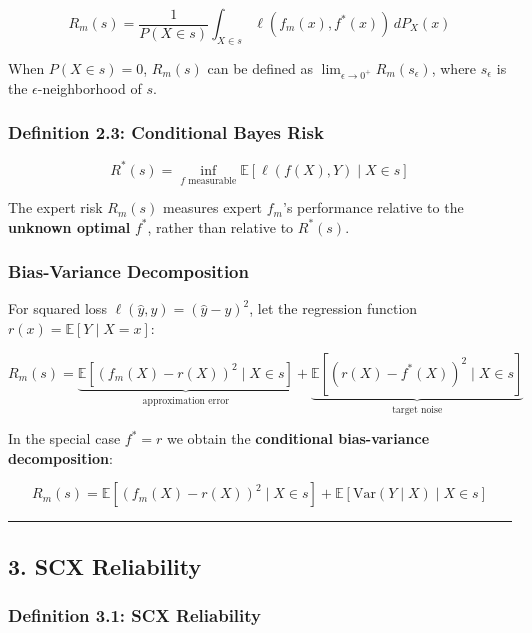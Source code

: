 \documentclass[
  12pt,
]{ctexart}
\begin{document}
\[R_m(s) = \frac{1}{P(X \in s)} \int_{X \in s} \ell(f_m(x), f^*(x)) \, dP_X(x)\]

When \(P(X \in s) = 0\), \(R_m(s)\) can be defined as
\(\lim_{\epsilon \to 0^+} R_m(s_\epsilon)\), where \(s_\epsilon\) is the \(\epsilon\)-neighborhood of \(s\).

\subsubsection{Definition 2.3: Conditional Bayes Risk}\label{definition-2.3-conditional-bayes-risk}

\[R^*(s) = \inf_{f \text{ measurable}} \mathbb{E}[\ell(f(X), Y) \mid X \in s]\]

The expert risk \(R_m(s)\) measures expert \(f_m\)'s performance relative to the \textbf{unknown optimal} \(f^*\), rather than relative to \(R^*(s)\).

\subsubsection{Bias-Variance Decomposition}\label{bias-variance-decomposition}

For squared loss \(\ell(\hat{y}, y) = (\hat{y} - y)^2\), let the regression function
\(r(x) = \mathbb{E}[Y \mid X = x]\):

\[R_m(s) = \underbrace{\mathbb{E}[(f_m(X) - r(X))^2 \mid X \in s]}_{\text{approximation error}} + \underbrace{\mathbb{E}[(r(X) - f^*(X))^2 \mid X \in s]}_{\text{target noise}}\]

In the special case \(f^* = r\) we obtain the \textbf{conditional bias-variance decomposition}:

\[R_m(s) = \mathbb{E}[(f_m(X) - r(X))^2 \mid X \in s] + \mathbb{E}[\text{Var}(Y \mid X) \mid X \in s]\]

\begin{center}\rule{0.5\linewidth}{0.5pt}\end{center}

\subsection{3. SCX Reliability}\label{scx-reliability}

\subsubsection{Definition 3.1: SCX Reliability}\label{definition-3.1-scx-reliability}
\end{document}
